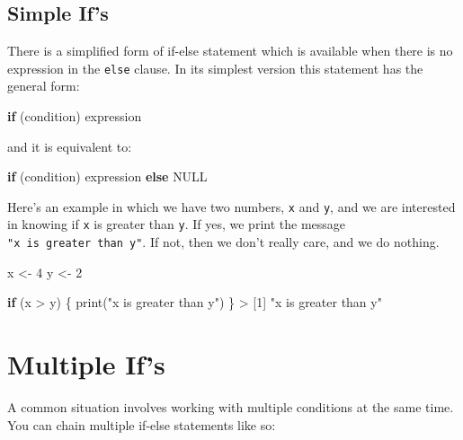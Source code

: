 \documentclass[
]{book}
\newenvironment{Shaded}{\begin{snugshade}}{\end{snugshade}}
\newcommand{\ConstantTok}[1]{\textcolor[rgb]{0.00,0.00,0.00}{#1}}
\newcommand{\ControlFlowTok}[1]{\textcolor[rgb]{0.13,0.29,0.53}{\textbf{#1}}}
\newcommand{\DecValTok}[1]{\textcolor[rgb]{0.00,0.00,0.81}{#1}}
\newcommand{\FunctionTok}[1]{\textcolor[rgb]{0.00,0.00,0.00}{#1}}
\newcommand{\NormalTok}[1]{#1}
\newcommand{\OtherTok}[1]{\textcolor[rgb]{0.56,0.35,0.01}{#1}}
\newcommand{\SpecialCharTok}[1]{\textcolor[rgb]{0.00,0.00,0.00}{#1}}
\newcommand{\StringTok}[1]{\textcolor[rgb]{0.31,0.60,0.02}{#1}}
\begin{document}
\hypertarget{simple-ifs}{%
\subsection{Simple If's}\label{simple-ifs}}

There is a simplified form of if-else statement which is available when
there is no expression in the \texttt{else} clause. In its simplest version this
statement has the general form:

\begin{Shaded}
\begin{Highlighting}[]
\ControlFlowTok{if}\NormalTok{ (condition) expression}
\end{Highlighting}
\end{Shaded}

and it is equivalent to:

\begin{Shaded}
\begin{Highlighting}[]
\ControlFlowTok{if}\NormalTok{ (condition) expression }\ControlFlowTok{else} \ConstantTok{NULL}
\end{Highlighting}
\end{Shaded}

Here's an example in which we have two numbers, \texttt{x} and \texttt{y}, and we are
interested in knowing if \texttt{x} is greater than \texttt{y}. If yes, we print the message
\texttt{"x\ is\ greater\ than\ y"}. If not, then we don't really care, and we do nothing.

\begin{Shaded}
\begin{Highlighting}[]
\NormalTok{x }\OtherTok{\textless{}{-}} \DecValTok{4}
\NormalTok{y }\OtherTok{\textless{}{-}} \DecValTok{2}

\ControlFlowTok{if}\NormalTok{ (x }\SpecialCharTok{\textgreater{}}\NormalTok{ y) \{}
  \FunctionTok{print}\NormalTok{(}\StringTok{"x is greater than y"}\NormalTok{)}
\NormalTok{\}}
\SpecialCharTok{\textgreater{}}\NormalTok{ [}\DecValTok{1}\NormalTok{] }\StringTok{"x is greater than y"}
\end{Highlighting}
\end{Shaded}

\hypertarget{multiple-ifs}{%
\section{Multiple If's}\label{multiple-ifs}}

A common situation involves working with multiple conditions at the same time.
You can chain multiple if-else statements like so:
\end{document}
